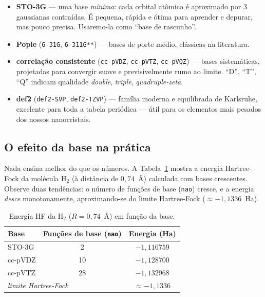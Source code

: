 \documentclass[11pt,a4paper,openany]{book}
\newcommand{\code}[1]{\texttt{#1}}
\begin{document}
\begin{itemize}[leftmargin=*]
  \item \textbf{STO-3G} --- uma base \emph{mínima}: cada orbital atômico é
        aproximado por 3 gaussianas contraídas. É pequena, rápida e ótima para
        aprender e depurar, mas pouco precisa. Usaremo-la como ``base de
        rascunho''.
  \item \textbf{Pople} (\code{6-31G}, \code{6-311G**}) --- bases de porte médio,
        clássicas na literatura.
  \item \textbf{correlação consistente} (\code{cc-pVDZ}, \code{cc-pVTZ},
        \code{cc-pVQZ}) --- bases sistemáticas, projetadas para convergir suave e
        previsivelmente rumo ao limite. ``D'', ``T'', ``Q'' indicam qualidade
        \emph{double}, \emph{triple}, \emph{quadruple-zeta}.
  \item \textbf{def2} (\code{def2-SVP}, \code{def2-TZVP}) --- família moderna e
        equilibrada de Karlsruhe, excelente para toda a tabela periódica ---
        útil para os elementos mais pesados dos nossos nanocristais.
\end{itemize}

\subsection{O efeito da base na prática}

Nada ensina melhor do que os números. A Tabela~\ref{tab:base} mostra a energia
Hartree-Fock da molécula H$_2$ (à distância de $0{,}74$~Å) calculada com bases
crescentes. Observe duas tendências: o número de funções de base (\code{nao})
cresce, e a energia \emph{desce} monotonamente, aproximando-se do limite
Hartree-Fock ($\approx -1{,}1336$~Ha).

\begin{table}[h]
  \centering
  \caption{Energia HF da H$_2$ ($R = 0{,}74$~Å) em função da base.}
  \label{tab:base}
  \begin{tabular}{lcc}
    \toprule
    \textbf{Base} & \textbf{Funções de base (\code{nao})} & \textbf{Energia (Ha)} \\
    \midrule
    STO-3G   & 2  & $-1{,}116759$ \\
    cc-pVDZ  & 10 & $-1{,}128700$ \\
    cc-pVTZ  & 28 & $-1{,}132968$ \\
    \midrule
    \multicolumn{2}{l}{\emph{limite Hartree-Fock}} & $\approx -1{,}1336$ \\
    \bottomrule
  \end{tabular}
\end{table}
\end{document}
